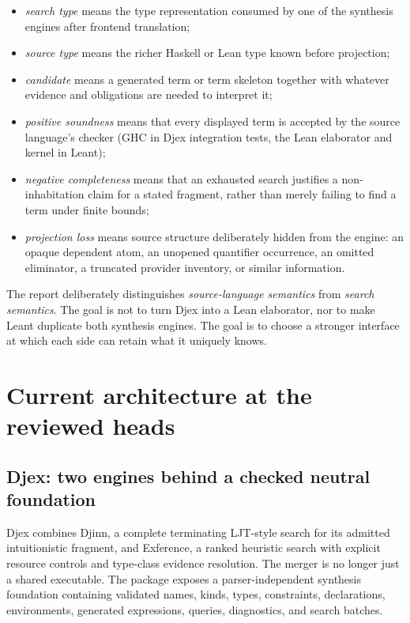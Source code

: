 \documentclass[11pt]{article}
\newcommand{\Djex}{\textsf{Djex}}
\newcommand{\Leant}{\textsf{Leant}}
\newcommand{\Djinn}{Djinn}
\newcommand{\Exference}{Exference}
\newcommand{\term}[1]{\emph{#1}}
\begin{document}
\begin{itemize}
  \item \term{search type} means the type representation consumed by one of
    the synthesis engines after frontend translation;
  \item \term{source type} means the richer Haskell or Lean type known before
    projection;
  \item \term{candidate} means a generated term or term skeleton together with
    whatever evidence and obligations are needed to interpret it;
  \item \term{positive soundness} means that every displayed term is accepted
    by the source language's checker (GHC in \Djex{} integration tests, the Lean
    elaborator and kernel in \Leant{});
  \item \term{negative completeness} means that an exhausted search justifies
    a non-inhabitation claim for a stated fragment, rather than merely failing
    to find a term under finite bounds;
  \item \term{projection loss} means source structure deliberately hidden from
    the engine: an opaque dependent atom, an unopened quantifier occurrence, an
    omitted eliminator, a truncated provider inventory, or similar information.
\end{itemize}

The report deliberately distinguishes \emph{source-language semantics} from
\emph{search semantics}.  The goal is not to turn \Djex{} into a Lean
elaborator, nor to make \Leant{} duplicate both synthesis engines.  The goal is
to choose a stronger interface at which each side can retain what it uniquely
knows.

\section{Current architecture at the reviewed heads}

\subsection{Djex: two engines behind a checked neutral foundation}

\Djex{} combines \Djinn{}, a complete terminating LJT-style search for its
admitted intuitionistic fragment, and \Exference{}, a ranked heuristic search
with explicit resource controls and type-class evidence resolution.  The
merger is no longer just a shared executable.  The package exposes a
parser-independent synthesis foundation containing validated names, kinds,
types, constraints, declarations, environments, generated expressions,
queries, diagnostics, and search batches.
\end{document}
